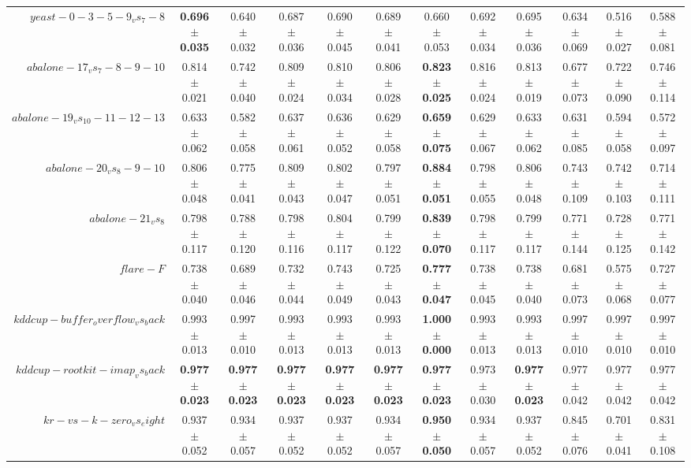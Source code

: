 \begin{table}[!ht]
{\begin{tabular}{r c c c c c c c c c c c}
$yeast-0-3-5-9_vs_7-8$ & \textbf{0.696 $\pm$ 0.035} & 0.640 $\pm$ 0.032 & 0.687 $\pm$ 0.036 & 0.690 $\pm$ 0.045 & 0.689 $\pm$ 0.041 & 0.660 $\pm$ 0.053 & 0.692 $\pm$ 0.034 & 0.695 $\pm$ 0.036 & 0.634 $\pm$ 0.069 & 0.516 $\pm$ 0.027 & 0.588 $\pm$ 0.081 \\
$abalone-17_vs_7-8-9-10$ & 0.814 $\pm$ 0.021 & 0.742 $\pm$ 0.040 & 0.809 $\pm$ 0.024 & 0.810 $\pm$ 0.034 & 0.806 $\pm$ 0.028 & \textbf{0.823 $\pm$ 0.025} & 0.816 $\pm$ 0.024 & 0.813 $\pm$ 0.019 & 0.677 $\pm$ 0.073 & 0.722 $\pm$ 0.090 & 0.746 $\pm$ 0.114 \\
$abalone-19_vs_10-11-12-13$ & 0.633 $\pm$ 0.062 & 0.582 $\pm$ 0.058 & 0.637 $\pm$ 0.061 & 0.636 $\pm$ 0.052 & 0.629 $\pm$ 0.058 & \textbf{0.659 $\pm$ 0.075} & 0.629 $\pm$ 0.067 & 0.633 $\pm$ 0.062 & 0.631 $\pm$ 0.085 & 0.594 $\pm$ 0.058 & 0.572 $\pm$ 0.097 \\
$abalone-20_vs_8-9-10$ & 0.806 $\pm$ 0.048 & 0.775 $\pm$ 0.041 & 0.809 $\pm$ 0.043 & 0.802 $\pm$ 0.047 & 0.797 $\pm$ 0.051 & \textbf{0.884 $\pm$ 0.051} & 0.798 $\pm$ 0.055 & 0.806 $\pm$ 0.048 & 0.743 $\pm$ 0.109 & 0.742 $\pm$ 0.103 & 0.714 $\pm$ 0.111 \\
$abalone-21_vs_8$ & 0.798 $\pm$ 0.117 & 0.788 $\pm$ 0.120 & 0.798 $\pm$ 0.116 & 0.804 $\pm$ 0.117 & 0.799 $\pm$ 0.122 & \textbf{0.839 $\pm$ 0.070} & 0.798 $\pm$ 0.117 & 0.799 $\pm$ 0.117 & 0.771 $\pm$ 0.144 & 0.728 $\pm$ 0.125 & 0.771 $\pm$ 0.142 \\
$flare-F$ & 0.738 $\pm$ 0.040 & 0.689 $\pm$ 0.046 & 0.732 $\pm$ 0.044 & 0.743 $\pm$ 0.049 & 0.725 $\pm$ 0.043 & \textbf{0.777 $\pm$ 0.047} & 0.738 $\pm$ 0.045 & 0.738 $\pm$ 0.040 & 0.681 $\pm$ 0.073 & 0.575 $\pm$ 0.068 & 0.727 $\pm$ 0.077 \\
$kddcup-buffer_overflow_vs_back$ & 0.993 $\pm$ 0.013 & 0.997 $\pm$ 0.010 & 0.993 $\pm$ 0.013 & 0.993 $\pm$ 0.013 & 0.993 $\pm$ 0.013 & \textbf{1.000 $\pm$ 0.000} & 0.993 $\pm$ 0.013 & 0.993 $\pm$ 0.013 & 0.997 $\pm$ 0.010 & 0.997 $\pm$ 0.010 & 0.997 $\pm$ 0.010 \\
$kddcup-rootkit-imap_vs_back$ & \textbf{0.977 $\pm$ 0.023} & \textbf{0.977 $\pm$ 0.023} & \textbf{0.977 $\pm$ 0.023} & \textbf{0.977 $\pm$ 0.023} & \textbf{0.977 $\pm$ 0.023} & \textbf{0.977 $\pm$ 0.023} & 0.973 $\pm$ 0.030 & \textbf{0.977 $\pm$ 0.023} & 0.977 $\pm$ 0.042 & 0.977 $\pm$ 0.042 & 0.977 $\pm$ 0.042 \\
$kr-vs-k-zero_vs_eight$ & 0.937 $\pm$ 0.052 & 0.934 $\pm$ 0.057 & 0.937 $\pm$ 0.052 & 0.937 $\pm$ 0.052 & 0.934 $\pm$ 0.057 & \textbf{0.950 $\pm$ 0.050} & 0.934 $\pm$ 0.057 & 0.937 $\pm$ 0.052 & 0.845 $\pm$ 0.076 & 0.701 $\pm$ 0.041 & 0.831 $\pm$ 0.108 \\

\end{tabular}}
\end{table}
